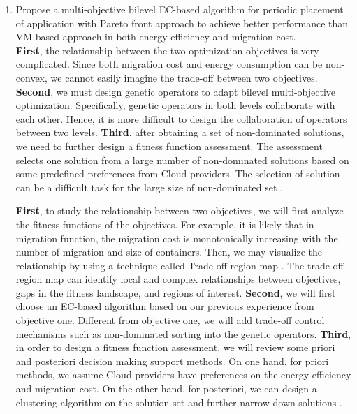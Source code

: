 \begin{enumerate}

	\item Propose a multi-objective bilevel EC-based algorithm for periodic placement of application with Pareto front approach to achieve better performance than VM-based approach in both energy efficiency and migration cost.\\

	 \textbf{First}, the relationship between the two optimization objectives is very complicated. Since both migration cost and energy consumption can be non-convex, we cannot easily imagine the trade-off between two objectives. \textbf{Second}, we must design genetic operators to adapt bilevel multi-objective optimization. Specifically, genetic operators in both levels collaborate with each other. Hence, it is more difficult to design the collaboration of operators between two levels.  \textbf{Third}, after obtaining a set of non-dominated solutions, we need to further design a fitness function assessment. The assessment selects one solution from a large number of non-dominated solutions based on some predefined preferences from Cloud providers. The selection of solution can be a difficult task for the large size of non-dominated set \cite{Zio:2012jz}. 

	 \textbf{First}, to study the relationship between two objectives, we will first analyze the fitness functions of the objectives. For example, it is likely that in migration function, the migration cost is monotonically increasing with the number of migration and size of containers. Then, we may visualize the relationship by using a technique called Trade-off region map \cite{Pinheiro:2015eu}. The trade-off region map can identify local and complex relationships between objectives, gaps in the fitness landscape, and regions of interest. \textbf{Second}, we will first choose an EC-based algorithm based on our previous experience from objective one. Different from objective one, we will add trade-off control mechanisms such as non-dominated sorting into the genetic operators. \textbf{Third}, in order to design a fitness function assessment, we will review some priori and posteriori decision making support methods. On one hand, for priori methods, we assume Cloud providers have preferences on the energy efficiency and migration cost.  On the other hand, for posteriori, we can design a clustering algorithm on the solution set and further narrow down solutions \cite{Zio:2011iq}. 


\end{enumerate}
